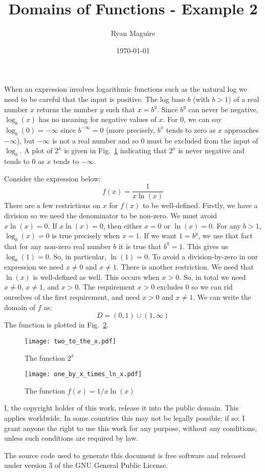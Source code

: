 \documentclass{article}
\title{Domains of Functions - Example 2}
\author{Ryan Maguire}
\date{\today}
\begin{document}
    \maketitle
    When an expression involves logarithmic functions such as the natural
    log we need to be careful that the input is positive. The log base
    $b$ (with $b>1$) of a real number $x$ returns the number $y$ such that
    $x=b^{y}$. Since $b^{y}$ can never be negative, $\log_{b}(x)$ has no
    meaning for negative values of $x$. For 0, we can say
    $\log_{b}(0)=-\infty$ since $b^{-\infty}=0$ (more precisely, $b^{x}$ tends
    to zero as $x$ approaches $-\infty$), but $-\infty$ is not a real
    number and so 0 must be excluded from the input of $\log_{b}$.
    A plot of $2^{x}$ is given in Fig.~\ref{fig:two_to_the_x} indicating that
    $2^{x}$ is never negative and tends to $0$ as $x$ tends to $-\infty$.
    \par\hfill\par
    Consider the expression below:
    \begin{equation}
        f(x)=\frac{1}{x\ln(x)}
    \end{equation}
    There are a few restrictions on $x$ for $f(x)$ to be well-defined. Firstly,
    we have a division so we need the denominator to be non-zero. We must
    avoid $x\ln(x)=0$. If $x\ln(x)=0$, then either $x=0$ or $\ln(x)=0$. For
    any $b>1$, $\log_{b}(x)=0$ is true precisely when $x=1$. If we want
    $1=b^{y}$, we use that fact that for any non-zero real number $b$ it is
    true that $b^{0}=1$. This gives us $\log_{b}(1)=0$. So, in particular,
    $\ln(1)=0$. To avoid a division-by-zero in our expression we need
    $x\ne{0}$ and $x\ne{1}$. There is another restriction. We need that
    $\ln(x)$ is well-defined as well. This occurs when $x>0$. So, in total
    we need $x\ne{0}$, $x\ne{1}$, and $x>0$. The requirement $x>0$ excludes
    0 so we can rid ourselves of the first requirement, and need
    $x>0$ and $x\ne{1}$. We can write the domain of $f$ as:
    \begin{equation}
        D=(0,1)\cup(1,\infty)
    \end{equation}
    The function is plotted in Fig.~\ref{fig:one_by_x_lnx}.
    \begin{figure}
        \centering
        \texttt{[image: two\_to\_the\_x.pdf]}
        \caption{The function $2^{x}$}
        \label{fig:two_to_the_x}
    \end{figure}
    \begin{figure}
        \centering
        \texttt{[image: one\_by\_x\_times\_ln\_x.pdf]}
        \caption{The function $f(x)=1/x\ln(x)$}
        \label{fig:one_by_x_lnx}
    \end{figure}
    \newpage
    I, the copyright holder of this work, release it into the public domain.
    This applies worldwide. In some countries this may not be legally possible;
    if so: I grant anyone the right to use this work for any purpose, without
    any conditions, unless such conditions are required by law.
    \par\hfill\par
    The source code used to generate this document is free software and released
    under version 3 of the GNU General Public License.
\end{document}
